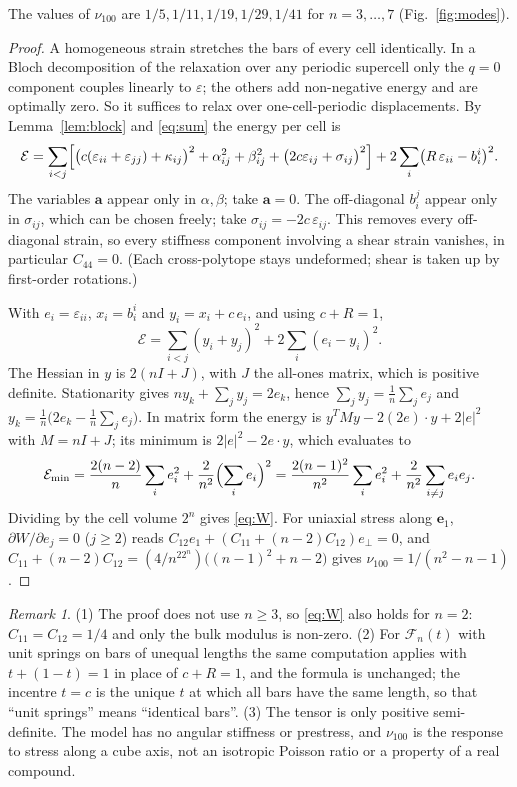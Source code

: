 \documentclass[11pt]{amsart}
\theoremstyle{definition}
\theoremstyle{remark}
\newtheorem{remark}{Remark}
\newcommand{\e}{\mathbf{e}}
\newcommand{\va}{\mathbf{a}}
\newcommand{\nus}{\nu_{100}}
\begin{document}
The values of $\nus$ are $1/5,1/11,1/19,1/29,1/41$ for $n=3,\dots,7$ (Fig.~\ref{fig:modes}).

\begin{proof}
A homogeneous strain stretches the bars of every cell identically. In a Bloch decomposition of the relaxation over any periodic supercell only the $q=0$ component couples linearly to $\varepsilon$; the others add non-negative energy and are optimally zero. So it suffices to relax over one-cell-periodic displacements. By Lemma~\ref{lem:block} and \eqref{eq:sum} the energy per cell is
\[
\mathcal E=\sum_{i<j}\Bigl[\bigl(c(\varepsilon_{ii}+\varepsilon_{jj})+\kappa_{ij}\bigr)^2+\alpha_{ij}^2+\beta_{ij}^2+\bigl(2c\varepsilon_{ij}+\sigma_{ij}\bigr)^2\Bigr]+2\sum_i\bigl(R\,\varepsilon_{ii}-b_i^i\bigr)^2 .
\]
The variables $\va$ appear only in $\alpha,\beta$; take $\va=0$. The off-diagonal $b_i^j$ appear only in $\sigma_{ij}$, which can be chosen freely; take $\sigma_{ij}=-2c\,\varepsilon_{ij}$. This removes every off-diagonal strain, so every stiffness component involving a shear strain vanishes, in particular $C_{44}=0$. (Each cross-polytope stays undeformed; shear is taken up by first-order rotations.)

With $e_i=\varepsilon_{ii}$, $x_i=b_i^i$ and $y_i=x_i+c\,e_i$, and using $c+R=1$,
\[
\mathcal E=\sum_{i<j}(y_i+y_j)^2+2\sum_i(e_i-y_i)^2 .
\]
The Hessian in $y$ is $2(nI+J)$, with $J$ the all-ones matrix, which is positive definite. Stationarity gives $n y_k+\sum_j y_j=2e_k$, hence $\sum_j y_j=\tfrac1n\sum_j e_j$ and $y_k=\tfrac1n\bigl(2e_k-\tfrac1n\sum_j e_j\bigr)$. In matrix form the energy is $y^TMy-2(2e)\cdot y+2|e|^2$ with $M=nI+J$; its minimum is $2|e|^2-2e\cdot y$, which evaluates to
\[
\mathcal E_{\min}=\frac{2(n-2)}{n}\sum_i e_i^2+\frac{2}{n^2}\Bigl(\sum_ie_i\Bigr)^2=\frac{2(n-1)^2}{n^2}\sum_ie_i^2+\frac{2}{n^2}\sum_{i\ne j}e_ie_j .
\]
Dividing by the cell volume $2^n$ gives \eqref{eq:W}. For uniaxial stress along $\e_1$, $\partial W/\partial e_j=0$ ($j\ge2$) reads $C_{12}e_1+(C_{11}+(n-2)C_{12})e_\perp=0$, and $C_{11}+(n-2)C_{12}=(4/n^22^n)\bigl((n-1)^2+n-2\bigr)$ gives $\nus=1/(n^2-n-1)$.
\end{proof}

\begin{remark}
(1) The proof does not use $n\ge3$, so \eqref{eq:W} also holds for $n=2$: $C_{11}=C_{12}=1/4$ and only the bulk modulus is non-zero. (2) For $\mathcal F_n(t)$ with unit springs on bars of unequal lengths the same computation applies with $t+(1-t)=1$ in place of $c+R=1$, and the formula is unchanged; the incentre $t=c$ is the unique $t$ at which all bars have the same length, so that ``unit springs'' means ``identical bars''. (3) The tensor is only positive semi-definite. The model has no angular stiffness or prestress, and $\nus$ is the response to stress along a cube axis, not an isotropic Poisson ratio or a property of a real compound.
\end{remark}
\end{document}
